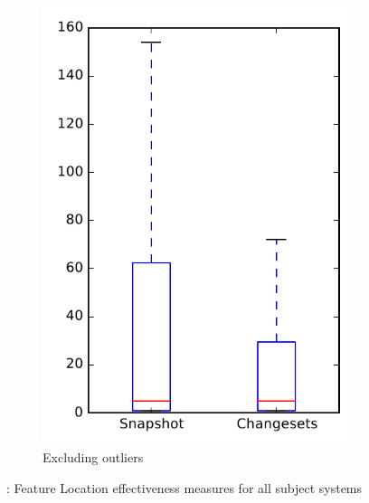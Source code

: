 \begin{figure}
\begin{subfigure}{.4\textwidth}
        \includegraphics[height=0.4\textheight]{figures/flt/rq1_overview_no_outlier}
        \caption{Excluding outliers}\label{fig:flt:rq1:overview_no_outlier}
    \end{subfigure}
\caption{\fone: Feature Location effectiveness measures for all subject systems}
\label{fig:flt:rq1:overview}
\end{figure}

